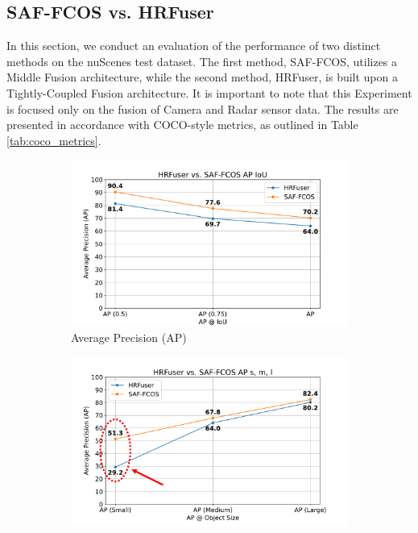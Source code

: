 \documentclass[report.tex]{subfiles}
\begin{document}
    \subsection{SAF-FCOS vs. HRFuser}

    In this section, we conduct an evaluation of the performance of two distinct methods on the nuScenes test dataset. The first method, SAF-FCOS, utilizes a Middle Fusion architecture, while the second method, HRFuser, is built upon a Tightly-Coupled Fusion architecture. It is important to note that this Experiment is focused only on the fusion of Camera and Radar sensor data. The results are presented in accordance with COCO-style metrics, as outlined in Table \ref{tab:coco_metrics}.

    \begin{figure}[h!]
        \centering
        \begin{subfigure}[b]{0.45\textwidth}
            \centering
            \includegraphics[width=\textwidth]{images/results/saf_vs_hrfuser/ap_iou.pdf}
            \caption{Average Precision (AP)}
            \label{fig:saf_vs_hrfuser_ap_iou}
        \end{subfigure}
        \hfill %
        \begin{subfigure}[b]{0.45\textwidth}
            \centering
            \includegraphics[width=\textwidth]{images/results/saf_vs_hrfuser/ap_sml_anno.pdf}

\end{subfigure}
\end{figure}
\end{document}
